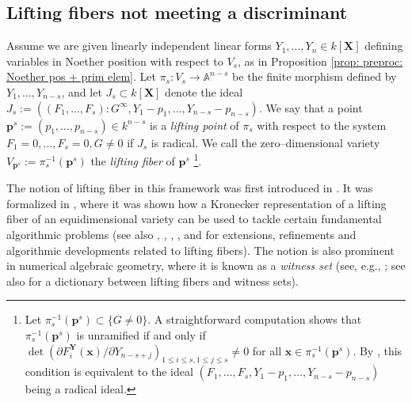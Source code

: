\documentclass[pdflatex,sn-basic]{sn-jnl}%
\theoremstyle{thmstyleone}%
\theoremstyle{thmstyletwo}%
\theoremstyle{thmstylethree}%
\theoremstyle{definition}
\numberwithin{equation}{section}
\newcommand{\bfs}{\boldsymbol}
\begin{document}
%
%
\subsection{Lifting fibers not meeting a discriminant}
\label{subsec: lifting fibers}
%
Assume we are given linearly independent linear forms $Y_1,\dots,
Y_{n}\in k[\bfs X]$ defining variables in Noether position with
respect to $V_s$, as in  Proposition \ref{prop: preproc: Noether pos
+ prim elem}. Let $\pi_s: V_s \rightarrow \mathbb{A}^{n-s}$ be the
finite morphism defined by $Y_1,\dots, Y_{n-s}$, and let $J_s\subset
k[\bfs X]$ denote the ideal
$J_s:=((F_1,\ldots,F_s):G^\infty,Y_1-p_1,\dots, Y_{n-s}-p_{n-s})$.
We say that a point $\bfs p^s:=(p_1,\ldots,p_{n-s})\in k^{n-s}$ is a
\emph{lifting point} of $\pi_s$ with respect to the system
$F_1=0,\dots, F_s=0, G\neq 0$ if $J_s$ is radical. We call the
zero--dimensional variety $V_{\bfs p^s}:=\pi_s^{-1}(\bfs p^s)$ the
\emph{lifting fiber} of $\bfs p^s$
%
\footnote{Let $\pi_s^{-1}(\bfs p^s)\subset\{G\not=0\}$. A straightforward computation 
shows that $\pi_s^{-1}(\bfs p^s)$ is unramified if and only if 
$\det(\partial F_i^{\bfs Y} (\bfs x)/\partial Y_{n-s+j})_{1\le i\le s,1\le j\le s}\not=0$ 
for all $\bfs x \in\pi_s^{-1}(\bfs p^s)$. By \cite[Theorem 18.15]{Eisenbud95},
this condition is equivalent to the ideal $(F_1,\ldots,F_s,Y_1-p_1,\dots, Y_{n-s}-p_{n-s})$ being
a radical ideal.}.

The notion of lifting fiber in this framework was first introduced
in \cite{GiHaHeMoMoPa97}. It was formalized in \cite{HeKrPuSaWa00},
where it was shown how a Kronecker representation of a lifting fiber
of an equidimensional variety can be used to tackle certain
fundamental algorithmic problems (see also \cite{GiLeSa01},
\cite{Schost03}, \cite{BoMaWaWa04}, \cite{PaSa04}, and
\cite{JeMaSoWa09} for extensions, refinements and algorithmic
developments related to lifting fibers). The notion is also
prominent in numerical algebraic geometry, where it is known as a
{\em witness set} (see, e.g., \cite{SoWa05}; see also
\cite{SoVeWa08} for a dictionary between lifting fibers and witness
sets).
\end{document}
